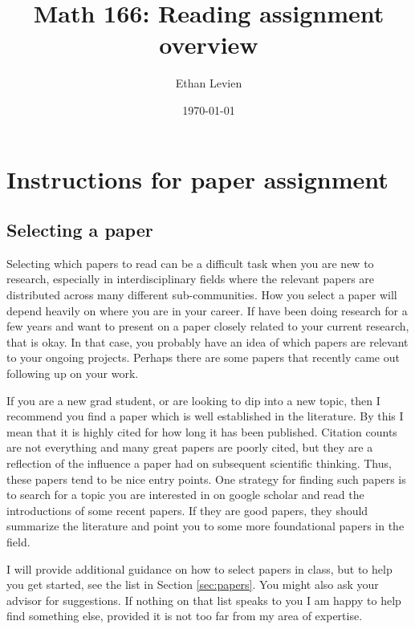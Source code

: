 \documentclass{amsart}
\title{Math 166: Reading assignment overview}
\author{Ethan Levien}
\date{\today}
\begin{document}
\maketitle


\section{Instructions for paper assignment}

\subsection{Selecting a paper}

Selecting which papers to read can be a difficult task when you are new to research, especially in interdisciplinary fields where the relevant papers are distributed across many different sub-communities. How you select a paper will depend heavily on where you are in your career. If have been doing research for a few years and want to present on a paper closely related to your current research, that is okay. In that case, you probably have an idea of which papers are relevant to your ongoing projects. Perhaps there are some papers that recently came out following up on your work.

If you are a new grad student, or are looking to dip into a new topic, then I recommend you find a paper which is well established in the literature. By this I mean that it is highly cited for how long it has been published.  Citation counts are not everything and many great papers are poorly cited, but they are a reflection of the influence a paper had on subsequent scientific thinking. Thus, these papers tend to be nice entry points.  One strategy for finding such papers is to search for a topic you are interested in on google scholar and read the introductions of some recent papers. If they are good papers, they should summarize the literature and point you to some more foundational papers in the field.  

I will provide additional guidance on how to select papers in class, but to help you get started, see the list in Section \ref{sec:papers}. You might also ask your advisor for suggestions.  If nothing on that list speaks to you I am happy to help find something else, provided it is not too far from my area of expertise.
\end{document}
